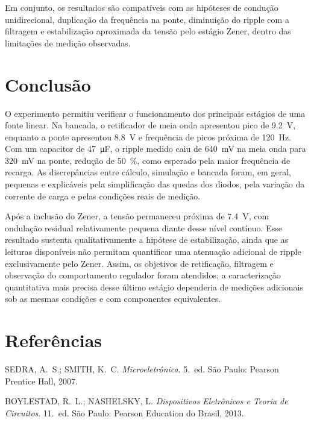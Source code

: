 \documentclass[11pt,a4paper]{article}
\begin{document}
Em conjunto, os resultados são compatíveis com as hipóteses de condução unidirecional, duplicação da frequência na ponte, diminuição do ripple com a filtragem e estabilização aproximada da tensão pelo estágio Zener, dentro das limitações de medição observadas.

\section{Conclusão}

O experimento permitiu verificar o funcionamento dos principais estágios de uma fonte linear. Na bancada, o retificador de meia onda apresentou pico de \SI{9,2}{\volt}, enquanto a ponte apresentou \SI{8,8}{\volt} e frequência de picos próxima de \SI{120}{\hertz}. Com um capacitor de \SI{47}{\micro\farad}, o ripple medido caiu de \SI{640}{\milli\volt} na meia onda para \SI{320}{\milli\volt} na ponte, redução de \SI{50}{\percent}, como esperado pela maior frequência de recarga. As discrepâncias entre cálculo, simulação e bancada foram, em geral, pequenas e explicáveis pela simplificação das quedas dos diodos, pela variação da corrente de carga e pelas condições reais de medição.

Após a inclusão do Zener, a tensão permaneceu próxima de \SI{7,4}{\volt}, com ondulação residual relativamente pequena diante desse nível contínuo. Esse resultado sustenta qualitativamente a hipótese de estabilização, ainda que as leituras disponíveis não permitam quantificar uma atenuação adicional de ripple exclusivamente pelo Zener. Assim, os objetivos de retificação, filtragem e observação do comportamento regulador foram atendidos; a caracterização quantitativa mais precisa desse último estágio dependeria de medições adicionais sob as mesmas condições e com componentes equivalentes.

\section{Referências}

\begin{referencias}
\item SEDRA, A.~S.; SMITH, K.~C. \emph{Microeletrônica}. 5.~ed. São Paulo: Pearson
  Prentice Hall, 2007.
\item BOYLESTAD, R.~L.; NASHELSKY, L. \emph{Dispositivos Eletrônicos e Teoria de
  Circuitos}. 11.~ed. São Paulo: Pearson Education do Brasil, 2013.
\end{referencias}
\end{document}
